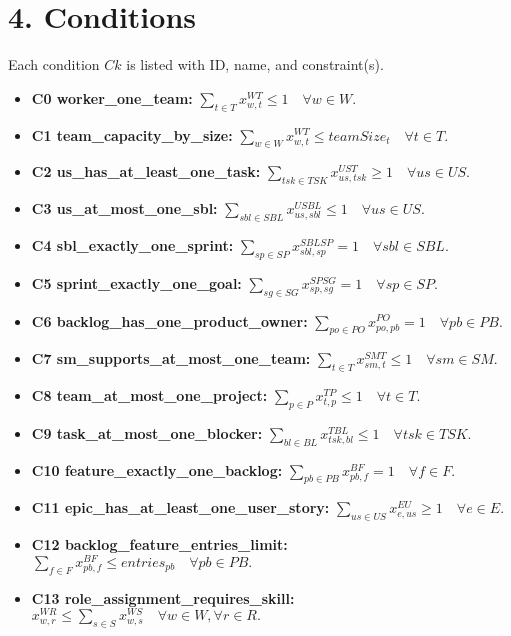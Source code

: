 \documentclass[11pt]{article}
\begin{document}
\section{4. Conditions}
Each condition $Ck$ is listed with ID, name, and constraint(s).

\begin{itemize}
  \item \textbf{C0 worker\_one\_team:} $\displaystyle \sum_{t\in T} x^{WT}_{w,t} \le 1 \quad \forall w\in W.$
  \item \textbf{C1 team\_capacity\_by\_size:} $\displaystyle \sum_{w\in W} x^{WT}_{w,t} \le teamSize_t \quad \forall t\in T.$
  \item \textbf{C2 us\_has\_at\_least\_one\_task:} $\displaystyle \sum_{tsk\in TSK} x^{UST}_{us,tsk} \ge 1 \quad \forall us\in US.$
  \item \textbf{C3 us\_at\_most\_one\_sbl:} $\displaystyle \sum_{sbl\in SBL} x^{USBL}_{us,sbl} \le 1 \quad \forall us\in US.$
  \item \textbf{C4 sbl\_exactly\_one\_sprint:} $\displaystyle \sum_{sp\in SP} x^{SBLSP}_{sbl,sp} = 1 \quad \forall sbl\in SBL.$
  \item \textbf{C5 sprint\_exactly\_one\_goal:} $\displaystyle \sum_{sg\in SG} x^{SPSG}_{sp,sg} = 1 \quad \forall sp\in SP.$
  \item \textbf{C6 backlog\_has\_one\_product\_owner:} $\displaystyle \sum_{po\in PO} x^{PO}_{po,pb} = 1 \quad \forall pb\in PB.$
  \item \textbf{C7 sm\_supports\_at\_most\_one\_team:} $\displaystyle \sum_{t\in T} x^{SMT}_{sm,t} \le 1 \quad \forall sm\in SM.$
  \item \textbf{C8 team\_at\_most\_one\_project:} $\displaystyle \sum_{p\in P} x^{TP}_{t,p} \le 1 \quad \forall t\in T.$
  \item \textbf{C9 task\_at\_most\_one\_blocker:} $\displaystyle \sum_{bl\in BL} x^{TBL}_{tsk,bl} \le 1 \quad \forall tsk\in TSK.$
  \item \textbf{C10 feature\_exactly\_one\_backlog:} $\displaystyle \sum_{pb\in PB} x^{BF}_{pb,f} = 1 \quad \forall f\in F.$
  \item \textbf{C11 epic\_has\_at\_least\_one\_user\_story:} $\displaystyle \sum_{us\in US} x^{EU}_{e,us} \ge 1 \quad \forall e\in E.$
  \item \textbf{C12 backlog\_feature\_entries\_limit:} $\displaystyle \sum_{f\in F} x^{BF}_{pb,f} \le entries_{pb} \quad \forall pb\in PB.$
  \item \textbf{C13 role\_assignment\_requires\_skill:} $\displaystyle x^{WR}_{w,r} \le \sum_{s\in S} x^{WS}_{w,s} \quad \forall w\in W, \forall r\in R.$
\end{itemize}
\end{document}
